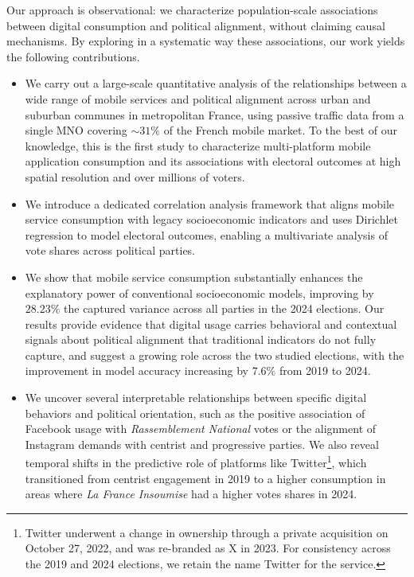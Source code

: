 \documentclass[9pt,sigconf,letterpaper]{acmart}
\newcommand{\RN}{\textsl{Rassemblement National}\xspace}
\newcommand{\LFI}{\textsl{La France Insoumise}\xspace}
\begin{document}
Our approach is observational: we characterize population-scale associations between digital consumption and political alignment, without claiming causal mechanisms.
By exploring in a systematic way these associations, our work yields the following contributions.
\begin{itemize}[noitemsep, topsep=0pt, leftmargin=10pt]
\item We carry out a large-scale quantitative analysis of the relationships between a wide range of mobile services and political alignment across urban and suburban communes in metropolitan France, using passive traffic data from a single \ac{MNO} covering ${\sim}31\%$ of the French mobile market. To the best of our knowledge, this is the first study to characterize multi-platform mobile application consumption and its associations with electoral outcomes at high spatial resolution and over millions of voters.
\item We introduce a dedicated correlation analysis framework that aligns mobile service consumption with legacy socioeconomic indicators and uses Dirichlet regression to model electoral outcomes, enabling a multivariate analysis of vote shares across political parties.
\item We show that mobile service consumption substantially enhances the explanatory power of conventional socioeconomic models, improving by $28.23\%$ the captured variance across all parties in the 2024 elections.
Our results provide evidence that digital usage carries behavioral and contextual signals about political alignment that traditional indicators do not fully capture, and suggest a growing role across the two studied elections, with the improvement in model accuracy increasing by $7.6\%$ from 2019 to 2024.
\item We uncover several interpretable relationships between specific digital behaviors and political orientation, such as the positive association of Facebook usage with \RN votes or the alignment of Instagram demands with centrist and progressive parties. We also reveal temporal shifts in the predictive role of platforms like Twitter\footnote{Twitter underwent a change in ownership through a private acquisition on October 27, 2022, and was re-branded as X in 2023. For consistency across the 2019 and 2024 elections, we retain the name Twitter for the service.}, which transitioned from centrist engagement in 2019 to a higher consumption in areas where \LFI had a higher votes shares in 2024.
\end{itemize}
\end{document}
